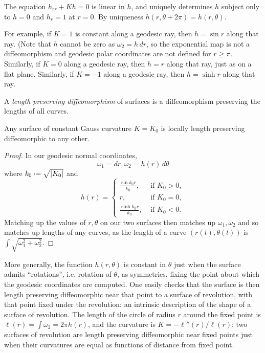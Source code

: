 The equation \(h_{rr}+Kh=0\) is linear in \(h\), and uniquely determines \(h\) subject only to \(h=0\) and \(h_r=1\) at \(r=0\).
By uniqueness \(h(r,\theta+2\pi)=h(r,\theta)\).

For example, if \(K=1\) is constant along a geodesic ray, then \(h=\sin r\) along that ray.
(Note that \(h\) cannot be zero as \(\omega_2=h \, dr\), so the exponential map is not a diffeomorphism and geodesic polar coordinates are not defined for \(r\ge\pi\).
Similarly, if \(K=0\) along a geodesic ray, then \(h=r\) along that ray, just as on a flat plane.
Similarly, if \(K=-1\) along a geodesic ray, then \(h=\sinh r\) along that ray.


A \emph{length preserving diffeomorphism} of surfaces is a diffeomorphism preserving the lengths of all curves.

\begin{theorem}\label{theorem:constant.Gauss.isometry}
Any surface of constant Gauss curvature \(K=K_0\) is locally length preserving diffeomorphic to any other.
\end{theorem}
\begin{proof}
In our geodesic normal coordinates,
\[
\omega_1 = dr, \omega_2 = h(r) \, d\theta
\]
where \(k_0\defeq\sqrt{\left|K_0\right|}\) and
\[
h(r) = \begin{cases}
\frac{\sin k_0 r}{k_0}, & \text{ if \(K_0 > 0\)}, \\
r, & \text{ if \(K_0=0\)}, \\
\frac{\sinh k_0 r}{k_0}, & \text{ if \(K_0 < 0\)}.
\end{cases}
\] 
Matching up the values of \(r,\theta\) on our two surfaces then matches up \(\omega_1, \omega_2\) and so matches up lengths of any curves, as the length of a curve \((r(t),\theta(t))\) is \(\int \sqrt{\omega_1^2+\omega_2^2}\).
\end{proof}
More generally, the function \(h(r,\theta)\) is constant in \(\theta\) just when the surface admits ``rotations'', i.e. rotation of \(\theta\), as symmetries, fixing the point about which the geodesic coordinates are computed.
One easily checks that the surface is then length preserving diffeomorphic near that point to a surface of revolution, with that point fixed under the revolution: an intrinsic description of the shape of a surface of revolution.
The length of the circle of radius \(r\) around the fixed point is \(\ell(r)=\int \omega_2=2\pi h(r)\), and the curvature is \(K=-\ell''(r)/\ell(r)\): two surfaces of revolution are length preserving diffeomorphic near fixed points just when their curvatures are equal as functions of distance from fixed point.



